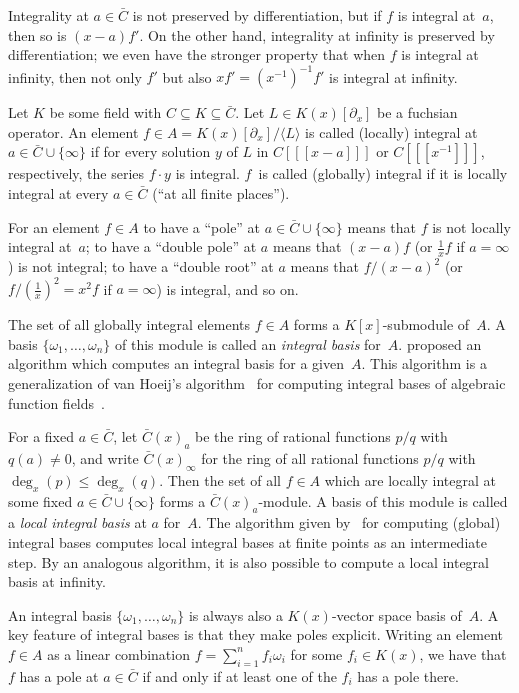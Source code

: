 \documentclass[final,1p,times,authoryear]{elsarticle}
\def\<#1>{\langle#1\rangle}
\begin{document}
Integrality at $a\in\bar C$ is not preserved by differentiation,
but if $f$ is integral at~$a$, then so is $(x-a)f'$. On the other hand,
integrality at infinity is preserved by differentiation; we even have the
stronger property that when $f$ is integral at infinity, then not only $f'$
but also $xf'=(x^{-1})^{-1}f'$ is integral at infinity.

Let $K$ be some field with $C\subseteq K\subseteq\bar C$.
Let $L\in K(x)[\partial_x]$ be a fuchsian operator. An element $f\in A=K(x)[\partial_x]/\<L>$
is called (locally) integral at $a\in\bar C\cup\{\infty\}$ if for every solution $y$
of $L$ in $C[[[x-a]]]$ or $C[[[x^{-1}]]]$, respectively, the series $f\cdot y$ is
integral. $f$~is called (globally) integral if it is locally integral at every
$a\in\bar C$ (``at all finite places'').

For an element $f\in A$ to have a ``pole'' at $a\in\bar C\cup\{\infty\}$ means
that $f$ is not locally integral at~$a$; to have a ``double pole'' at $a$ means
that $(x-a)f$ (or $\frac1xf$ if $a=\infty$) is not integral; to have a ``double
root'' at $a$ means that $f/(x-a)^2$ (or $f/(\frac1x)^2=x^2f$ if $a=\infty$) is integral,
and so on.

The set of all globally integral elements $f\in A$ forms a $K[x]$-submodule of~$A$.
A basis $\{\omega_1,\dots,\omega_n\}$ of this module is called an \emph{integral basis}
for~$A$. \cite{kauers15b} proposed an algorithm which computes an integral basis
for a given~$A$. This algorithm is a generalization of van Hoeij's
algorithm~\citep{vanHoeij94} for computing integral bases of algebraic function
fields~\citep{trager84,Rybowicz:1991:ACI:120694.120715}.

For a fixed $a\in\bar C$, let $\bar C(x)_a$ be the ring of rational functions $p/q$
with $q(a)\neq0$, and write $\bar C(x)_\infty$ for the ring of all
rational functions $p/q$ with $\deg_x(p)\leq\deg_x(q)$.
Then the set of all $f\in A$ which are locally integral at some
fixed $a\in\bar C\cup\{\infty\}$ forms a $\bar C(x)_a$-module. A basis of this module is
called a \emph{local integral basis} at $a$ for~$A$. The algorithm given by~\cite{kauers15b}
for computing (global) integral bases computes local integral bases at finite
points as an intermediate step. By an analogous algorithm, it is also possible
to compute a local integral basis at infinity.

An integral basis $\{\omega_1,\dots,\omega_n\}$ is always also a $K(x)$-vector space
basis of~$A$. A key feature of integral bases is that they make poles explicit. Writing
an element $f\in A$ as a linear combination $f=\sum_{i=1}^n f_i\omega_i$ for some
$f_i\in K(x)$, we have that $f$ has a pole at $a\in\bar C$ if and only if at least one
of the $f_i$ has a pole there.
\end{document}
